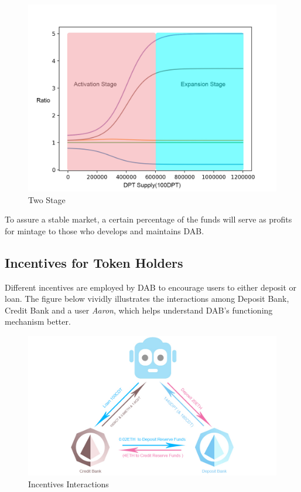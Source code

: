 \documentclass[review]{elsarticle}
\begin{document}
\begin{figure}[H]
\begin{center}
\includegraphics[width=4.5in]{Graphs/Two_Stage.jpg}
\end{center}
\caption{Two Stage}\label{TS}
\end{figure}

To assure a stable market, a certain percentage of the funds will serve as profits for mintage to those who develops and maintains DAB.

\subsection{Incentives for Token Holders}
Different incentives are employed by DAB to encourage users to either deposit or loan. The figure below vividly illustrates the interactions among Deposit Bank, Credit Bank and a user \emph{Aaron}, which helps understand DAB's functioning mechanism better.

\begin{figure}[H]
\begin{center}
\includegraphics[width=4.5in]{Graphs/InterestDistribution.jpg}
\end{center}
\caption{Incentives Interactions}\label{TS}
\end{figure}
\end{document}
